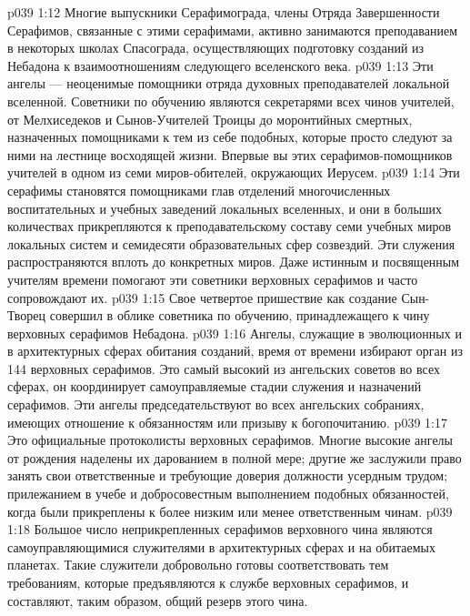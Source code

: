 \vs p039 1:12 Многие выпускники Серафимограда, члены Отряда Завершенности Серафимов, связанные с этими серафимами, активно занимаются преподаванием в некоторых школах Спасограда, осуществляющих подготовку созданий из Небадона к взаимоотношениям следующего вселенского века.
\vs p039 1:13 \bibnobreakspace {} Эти ангелы --- неоценимые помощники отряда духовных преподавателей локальной вселенной. Советники по обучению являются секретарями всех чинов учителей, от Мелхиседеков и Сынов\hyp{}Учителей Троицы до моронтийных смертных, назначенных помощниками к тем из себе подобных, которые просто следуют за ними на лестнице восходящей жизни. Впервые вы  этих серафимов\hyp{}помощников учителей в одном из семи миров\hyp{}обителей, окружающих Иерусем.
\vs p039 1:14 Эти серафимы становятся помощниками глав отделений многочисленных воспитательных и учебных заведений локальных вселенных, и они в больших количествах прикрепляются к преподавательскому составу семи учебных миров локальных систем и семидесяти образовательных сфер созвездий. Эти служения распространяются вплоть до конкретных миров. Даже истинным и посвященным учителям времени помогают эти советники верховных серафимов и часто сопровождают их.
\vs p039 1:15 Свое четвертое пришествие как создание Сын\hyp{}Творец совершил в облике советника по обучению, принадлежащего к чину верховных серафимов Небадона.
\vs p039 1:16 \bibnobreakspace {} Ангелы, служащие в эволюционных и в архитектурных сферах обитания созданий, время от времени избирают орган из 144 верховных серафимов. Это самый высокий из ангельских советов во всех сферах, он координирует самоуправляемые стадии служения и назначений серафимов. Эти ангелы председательствуют во всех ангельских собраниях, имеющих отношение к обязанностям или призыву к богопочитанию.
\vs p039 1:17 \bibnobreakspace {} Это официальные протоколисты верховных серафимов. Многие высокие ангелы от рождения наделены их дарованием в полной мере; другие же заслужили право занять свои ответственные и требующие доверия должности усердным трудом; прилежанием в учебе и добросовестным выполнением подобных обязанностей, когда были прикреплены к более низким или менее ответственным чинам.
\vs p039 1:18 \bibnobreakspace {} Большое число неприкрепленных серафимов верховного чина являются самоуправляющимися служителями в архитектурных сферах и на обитаемых планетах. Такие служители добровольно готовы соответствовать тем требованиям, которые предъявляются к службе верховных серафимов, и составляют, таким образом, общий резерв этого чина.
